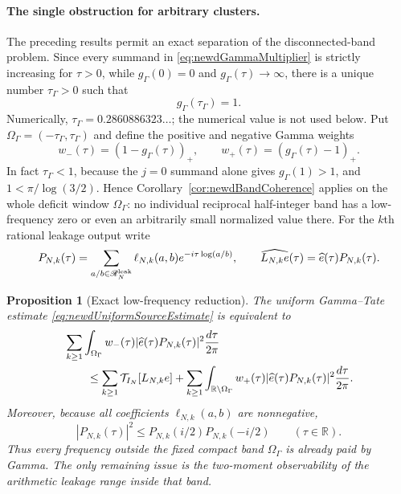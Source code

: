 \documentclass[11pt]{amsart}
\newtheorem{proposition}[theorem]{Proposition}
\theoremstyle{definition}
\theoremstyle{remark}
\newcommand{\R}{\mathbb R}
\begin{document}
\paragraph{The single obstruction for arbitrary clusters.}
The preceding results permit an exact separation of the disconnected-band
problem.  Since every summand in \eqref{eq:newdGammaMultiplier} is strictly
increasing for $\tau>0$, while $g_\Gamma(0)=0$ and
$g_\Gamma(\tau)\to\infty$, there is a unique number
$\tau_\Gamma>0$ such that
\begin{equation}\label{eq:newdGammaCutoff}
 g_\Gamma(\tau_\Gamma)=1.
\end{equation}
Numerically, $\tau_\Gamma=0.2860886323\ldots$; the numerical value is not
used below.  Put $\Omega_\Gamma=(-\tau_\Gamma,\tau_\Gamma)$ and define the
positive and negative Gamma weights
\[
 w_-(\tau)=(1-g_\Gamma(\tau))_+,
 \qquad
 w_+(\tau)=(g_\Gamma(\tau)-1)_+.
\]
In fact $\tau_\Gamma<1$, because the $j=0$ summand alone gives
$g_\Gamma(1)>1$, and $1<\pi/\log(3/2)$.  Hence
Corollary~\ref{cor:newdBandCoherence} applies on the whole deficit window
$\Omega_\Gamma$: no individual reciprocal half-integer band has a
low-frequency zero or even an arbitrarily small normalized value there.
For the $k$th rational leakage output write
\begin{equation}\label{eq:newdLeakagePolynomial}
 P_{N,k}(\tau)=
 \sum_{a/b\in\mathscr R_N^{\rm leak}}
 \ell_{N,k}(a,b)e^{-i\tau\log(a/b)},
 \qquad
 \widehat{L_{N,k}e}(\tau)=\widehat e(\tau)P_{N,k}(\tau).
\end{equation}

\begin{proposition}[Exact low-frequency reduction]
\label{prop:newdLowFrequencyReduction}
The uniform Gamma--Tate estimate
\eqref{eq:newdUniformSourceEstimate} is equivalent to
\begin{align}
 &\sum_{k\geq1}\int_{\Omega_\Gamma}
    w_-(\tau)|\widehat e(\tau)P_{N,k}(\tau)|^2
       \frac{d\tau}{2\pi}                                \notag\\
 &\qquad\leq
 \sum_{k\geq1}\mathcal T_{I_N}[L_{N,k}e]
 +\sum_{k\geq1}\int_{\R\setminus\Omega_\Gamma}
    w_+(\tau)|\widehat e(\tau)P_{N,k}(\tau)|^2
       \frac{d\tau}{2\pi}.
 \label{eq:newdLowFrequencyObservability}
\end{align}
Moreover, because all coefficients
$\ell_{N,k}(a,b)$ are nonnegative,
\begin{equation}\label{eq:newdPositiveCoefficientEnvelope}
 |P_{N,k}(\tau)|^2
 \leq P_{N,k}(i/2)P_{N,k}(-i/2)
 \qquad(\tau\in\R).
\end{equation}
Thus every frequency outside the fixed compact band
$\Omega_\Gamma$ is already paid by Gamma.  The only remaining issue is the
two-moment observability of the arithmetic leakage range inside that band.
\end{proposition}
\end{document}
